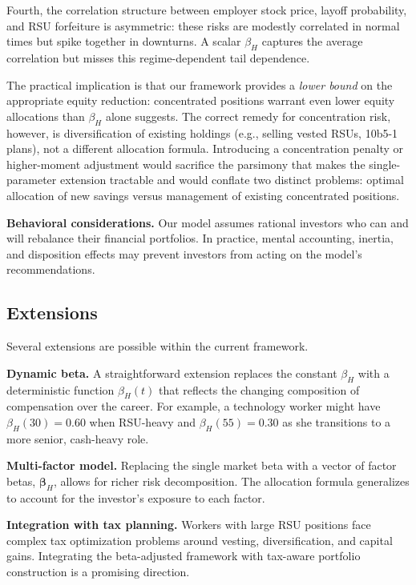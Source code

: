 \documentclass[11pt]{article}
\begin{document}
Fourth, the correlation structure between employer stock price, layoff
probability, and RSU forfeiture is asymmetric: these risks are modestly
correlated in normal times but spike together in downturns. A scalar
$\beta_H$ captures the average correlation but misses this
regime-dependent tail dependence.

The practical implication is that our framework provides a \emph{lower bound}
on the appropriate equity reduction: concentrated positions warrant even
lower equity allocations than $\beta_H$ alone suggests. The correct remedy
for concentration risk, however, is diversification of existing holdings
(e.g., selling vested RSUs, 10b5-1 plans), not a different allocation
formula. Introducing a concentration penalty or higher-moment adjustment
would sacrifice the parsimony that makes the single-parameter extension
tractable and would conflate two distinct problems: optimal allocation of
new savings versus management of existing concentrated positions.

\textbf{Behavioral considerations.} Our model assumes rational investors
who can and will rebalance their financial portfolios. In practice, mental
accounting, inertia, and disposition effects may prevent investors from
acting on the model's recommendations.

\subsection{Extensions}

Several extensions are possible within the current framework.

\textbf{Dynamic beta.} A straightforward extension replaces the constant
$\beta_H$ with a deterministic function $\beta_H(t)$ that reflects the
changing composition of compensation over the career. For example, a
technology worker might have $\beta_H(30) = 0.60$ when RSU-heavy and
$\beta_H(55) = 0.30$ as she transitions to a more senior, cash-heavy role.

\textbf{Multi-factor model.} Replacing the single market beta with a
vector of factor betas, $\boldsymbol{\beta}_H$, allows for richer risk
decomposition. The allocation formula generalizes to account for the
investor's exposure to each factor.

\textbf{Integration with tax planning.} Workers with large RSU positions
face complex tax optimization problems around vesting, diversification,
and capital gains. Integrating the beta-adjusted framework with tax-aware
portfolio construction is a promising direction.
\end{document}
